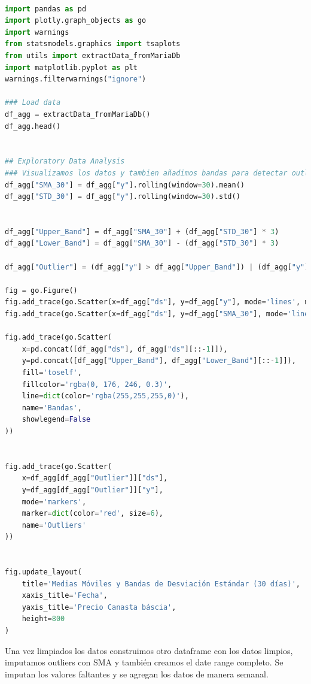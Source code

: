 \documentclass{article}
\begin{document}
\begin{lstlisting}[language=Python, caption={python version}]

import pandas as pd
import plotly.graph_objects as go
import warnings
from statsmodels.graphics import tsaplots
from utils import extractData_fromMariaDb
import matplotlib.pyplot as plt
warnings.filterwarnings("ignore")

### Load data
df_agg = extractData_fromMariaDb()
df_agg.head()


## Exploratory Data Analysis
### Visualizamos los datos y tambien añadimos bandas para detectar outliers
df_agg["SMA_30"] = df_agg["y"].rolling(window=30).mean()
df_agg["STD_30"] = df_agg["y"].rolling(window=30).std()


df_agg["Upper_Band"] = df_agg["SMA_30"] + (df_agg["STD_30"] * 3)
df_agg["Lower_Band"] = df_agg["SMA_30"] - (df_agg["STD_30"] * 3)

df_agg["Outlier"] = (df_agg["y"] > df_agg["Upper_Band"]) | (df_agg["y"] < df_agg["Lower_Band"])

fig = go.Figure()
fig.add_trace(go.Scatter(x=df_agg["ds"], y=df_agg["y"], mode='lines', name='Datos originales'))
fig.add_trace(go.Scatter(x=df_agg["ds"], y=df_agg["SMA_30"], mode='lines', name='SMA 30 días'))

fig.add_trace(go.Scatter(
    x=pd.concat([df_agg["ds"], df_agg["ds"][::-1]]), 
    y=pd.concat([df_agg["Upper_Band"], df_agg["Lower_Band"][::-1]]),
    fill='toself',
    fillcolor='rgba(0, 176, 246, 0.3)',  
    line=dict(color='rgba(255,255,255,0)'),
    name='Bandas',
    showlegend=False
))


fig.add_trace(go.Scatter(
    x=df_agg[df_agg["Outlier"]]["ds"], 
    y=df_agg[df_agg["Outlier"]]["y"], 
    mode='markers', 
    marker=dict(color='red', size=6),
    name='Outliers'
))


fig.update_layout(
    title='Medias Móviles y Bandas de Desviación Estándar (30 días)',
    xaxis_title='Fecha',
    yaxis_title='Precio Canasta báscia',
    height=800 
)

\end{lstlisting}

Una vez limpiados los datos construimos otro dataframe con los datos limpios, imputamos outliers con SMA y también creamos el date range completo. Se imputan los valores faltantes y se agregan los datos de manera semanal.
\end{document}
